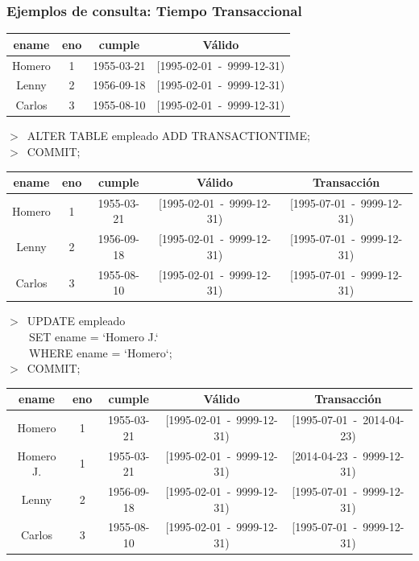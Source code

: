 \documentclass[a4paper,12pt,oneside]{report}
\begin{document}
\subsubsection*{Ejemplos de consulta: Tiempo Transaccional}
\begin{center}
\begin{tabular}{|c|c|c||c|}
\hline
ename & eno & cumple & V\'alido\\
\hline
Homero & 1 & 1955-03-21 & [1995-02-01\ -\ 9999-12-31)\\
\hline
Lenny & 2 & 1956-09-18 & [1995-02-01\ -\ 9999-12-31)\\
\hline
Carlos & 3 & 1955-08-10 & [1995-02-01\ -\ 9999-12-31)\\
\hline
\end{tabular}
\end{center}
$>$\ ALTER TABLE empleado ADD TRANSACTIONTIME;\\
$>$\ COMMIT;
\begin{center}
\begin{tabular}{|c|c|c||c|c|}
\hline
ename & eno & cumple & V\'alido & Transacci\'on\\
\hline
Homero & 1 & 1955-03-21 & [1995-02-01\ -\ 9999-12-31) & [1995-07-01\ -\ 9999-12-31)\\
\hline
Lenny & 2 & 1956-09-18 & [1995-02-01\ -\ 9999-12-31) & [1995-07-01\ -\ 9999-12-31)\\
\hline
Carlos & 3 & 1955-08-10 & [1995-02-01\ -\ 9999-12-31) & [1995-07-01\ -\ 9999-12-31)\\
\hline
\end{tabular}
\end{center}
$>$\ UPDATE empleado\\
\ \ \ \ SET ename = `Homero J.`\\
\ \ \ \ WHERE ename = `Homero`;\\
$>$\ COMMIT;
\begin{center}
\begin{tabular}{|c|c|c||c|c|}
\hline
ename & eno & cumple & V\'alido & Transacci\'on\\
\hline
Homero & 1 & 1955-03-21 & [1995-02-01\ -\ 9999-12-31) & [1995-07-01\ -\ 2014-04-23)\\
\hline
Homero J. & 1 & 1955-03-21 & [1995-02-01\ -\ 9999-12-31) & [2014-04-23\ -\ 9999-12-31)\\
\hline
Lenny & 2 & 1956-09-18 & [1995-02-01\ -\ 9999-12-31) & [1995-07-01\ -\ 9999-12-31)\\
\hline
Carlos & 3 & 1955-08-10 & [1995-02-01\ -\ 9999-12-31) & [1995-07-01\ -\ 9999-12-31)\\
\hline
\end{tabular}
\end{center}
\end{document}
